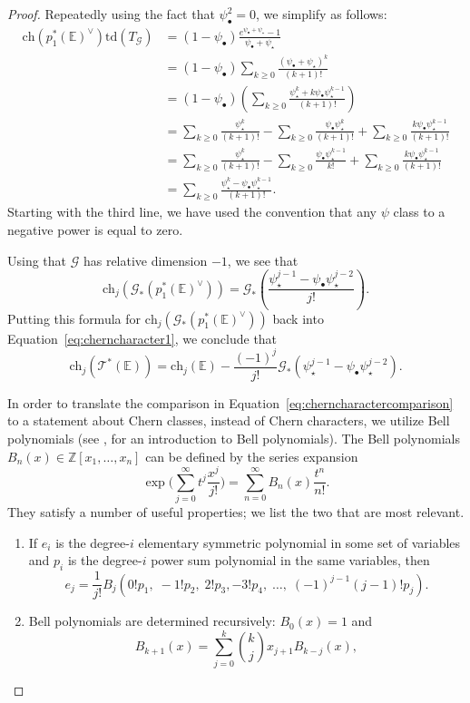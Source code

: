\documentclass[12pt]{amsart}
\newcounter{intro}[section]
\theoremstyle{definition}
\newcommand{\T}{\mathcal{T}}
\newcommand{\bE}{\mathbb{E}}
\newcommand{\G}{\mathcal{G}}
\newcommand{\ch}{\mathrm{ch}}
\newcommand{\td}{\mathrm{td}}
\newcommand{\Z}{\mathbb{Z}}
\numberwithin{equation}{section}
\begin{document}
\begin{proof}
Repeatedly using the fact that $\psi_\bullet^2=0$, we simplify as follows:
\begin{align*}
\ch(p_1^*(\bE)^\vee)\td(T_\G)&=(1-\psi_\bullet)\frac{e^{\psi_\bullet+\psi_\star}-1}{\psi_\bullet+\psi_\star}\\
&=(1-\psi_\bullet)\sum_{k\geq 0}\frac{(\psi_\bullet+\psi_\star)^k}{(k+1)!}\\
&=(1-\psi_\bullet)\left(\sum_{k\geq 0}\frac{\psi_\star^k+k\psi_\bullet\psi_\star^{k-1}}{(k+1)!} \right)\\
&=\sum_{k\geq 0}\frac{\psi_\star^k}{(k+1)!}-\sum_{k\geq 0}\frac{\psi_\bullet\psi_\star^k}{(k+1)!}+\sum_{k\geq 0}\frac{k\psi_\bullet\psi_\star^{k-1}}{(k+1)!}\\
&=\sum_{k\geq 0}\frac{\psi_\star^k}{(k+1)!} - \sum_{k\geq 0} \frac{\psi_\bullet \psi_\star^{k-1}}{k!} + \sum_{k\geq 0} \frac{k \psi_\bullet \psi_\star^{k-1}}{(k+1)!} \\
&=\sum_{k\geq 0}\frac{\psi_\star^k-\psi_\bullet\psi_\star^{k-1}}{(k+1)!}.
\end{align*}
Starting with the third line, we have used the convention that any $\psi$ class to a negative power is equal to zero.

Using that $\G$ has relative dimension $-1$, we see that
\[
\ch_j(\G_*(p_1^*(\bE)^\vee))=\G_*\left(\frac{\psi_\star^{j-1}-\psi_\bullet\psi_\star^{j-2}}{j!}\right).
\]
Putting this formula for $\ch_j(\G_*(p_1^*(\bE)^\vee))$ back into Equation~\eqref{eq:cherncharacter1}, we conclude that
\begin{equation}\label{eq:cherncharactercomparison}
\ch_j(\T^*(\bE))=\ch_j(\bE)-\frac{(-1)^j}{j!}\G_*\left(\psi_\star^{j-1}-\psi_\bullet\psi_\star^{j-2}\right).
\end{equation}

In order to translate the comparison in Equation~\eqref{eq:cherncharactercomparison} to a statement about Chern classes, instead of Chern characters, we utilize Bell polynomials (see \cite[Section 3.3]{Comtet}, for an introduction to Bell polynomials). The Bell polynomials $B_n(x)\in\Z[x_1,\dots,x_n]$ can be defined by the series expansion
\[
\exp\bigg(\sum_{j=0}^\infty t^j\frac{x^j}{j!}\bigg)=\sum_{n=0}^\infty B_n(x)\frac{t^n}{n!}.
\]
They satisfy a number of useful properties; we list the two that are most relevant.
\begin{enumerate}
\item[(B1)] If $e_i$ is the degree-$i$ elementary symmetric polynomial in some set of variables and $p_i$ is the degree-$i$ power sum polynomial in the same variables, then 
\[
e_j=\frac{1}{j!}B_j(0!p_1,\;-1!p_2,\;2!p_3,-3!p_4,\;\dots,\;(-1)^{j-1}(j-1)!p_j).
\]
\item[(B2)] Bell polynomials are determined recursively: $B_0(x)=1$ and
\[
B_{k+1}(x)=\sum_{j=0}^{k}{k\choose j}x_{j+1}B_{k-j}(x),
\]
\end{enumerate}


\end{proof}
\end{document}
